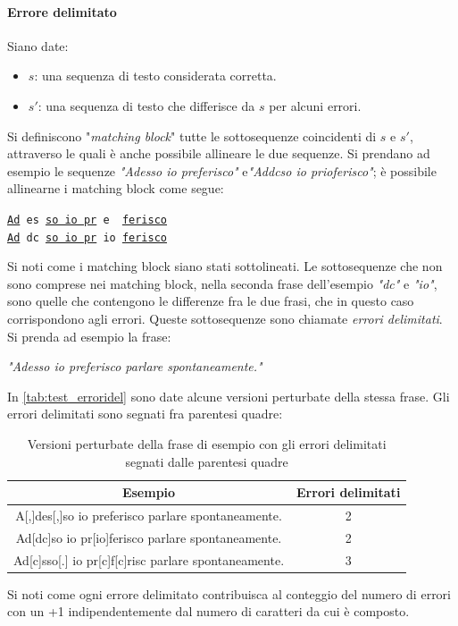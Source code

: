 \paragraph{Errore delimitato} Siano date:
\begin{itemize}
\item $s$: una sequenza di testo considerata corretta.
\item $s\prime$: una sequenza di testo che differisce da $s$ per alcuni errori. 
\end{itemize}
Si definiscono "\textit{matching block}" tutte le sottosequenze coincidenti di $s$ e $s\prime$, attraverso le quali è anche possibile allineare le due sequenze. Si prendano ad esempio le sequenze \textit{"Adesso io preferisco"} e\textit{"Addcso io prioferisco"}; è possibile allinearne i matching block come segue:
\begin{center}
\noindent
\texttt{\underline{Ad} es \underline{so io pr} e\ \ \underline{ferisco}}\\
\texttt{\underline{Ad} dc \underline{so io pr} io \underline{ferisco}}
\end{center}
Si noti come i matching block siano stati sottolineati. Le sottosequenze che non sono comprese nei matching block, nella seconda frase dell'esempio \textit{"dc"} e \textit{"io"}, sono quelle che contengono le differenze fra le due frasi, che in questo caso corrispondono agli errori. Queste sottosequenze sono chiamate \textit{errori delimitati}.\\
Si prenda ad esempio la frase:
\begin{center}
\textit{"Adesso io preferisco parlare spontaneamente."}
\end{center}
In \autoref{tab:test_erroridel} sono date alcune versioni perturbate della stessa frase. Gli errori delimitati sono segnati fra parentesi quadre:

\begin{table}[H]
\centering
\begin{tabular}{cc}
\textbf{Esempio} & \textbf{Errori delimitati}\\
\hline
A[,]des[,]so io preferisco parlare spontaneamente. & 2 \\
Ad[dc]so io pr[io]ferisco parlare spontaneamente. & 2 \\
Ad[c]sso[.] io pr[c]f[c]risc parlare spontaneamente. & 3\\
\end{tabular}
\caption{Versioni perturbate della frase di esempio con gli errori delimitati segnati dalle parentesi quadre}
\label{tab:test_erroridel}
\end{table}
\noindent
Si noti come ogni errore delimitato contribuisca al conteggio del numero di errori con un +1 indipendentemente dal numero di caratteri da cui è composto.


